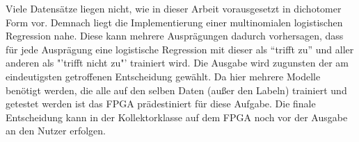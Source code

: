 Viele Datensätze liegen nicht, wie in dieser Arbeit vorausgesetzt in dichotomer Form vor. Demnach liegt die Implementierung einer multinomialen logistischen Regression nahe. Diese kann mehrere Ausprägungen dadurch vorhersagen, dass für jede Ausprägung eine logistische Regression mit dieser als "`trifft zu"' und aller anderen als "'trifft nicht zu"' trainiert wird. Die Ausgabe wird zugunsten der am eindeutigsten getroffenen Entscheidung gewählt. Da hier mehrere Modelle benötigt werden, die alle auf den selben Daten (außer den Labeln) trainiert und getestet werden ist das FPGA prädestiniert für diese Aufgabe. Die finale Entscheidung kann in der Kollektorklasse auf dem FPGA noch vor der Ausgabe  an den Nutzer erfolgen.